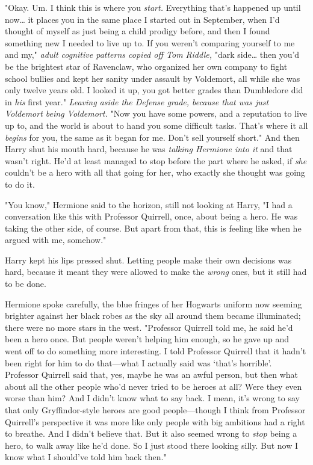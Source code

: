 "Okay. Um. I think this is where you \emph{start.} Everything that's happened
up until now{\ldots} it places you in the same place I started out in
September, when I'd thought of myself as just being a child prodigy before, and
then I found something new I needed to live up to. If you weren't comparing
yourself to me and my," \emph{adult cognitive patterns copied off Tom Riddle,}
"dark side{\ldots} then you'd be the brightest star of Ravenclaw, who organized
her own company to fight school bullies and kept her sanity under assault by
Voldemort, all while she was only twelve years old. I looked it up, you got
better grades than Dumbledore did in \emph{his} first year." \emph{Leaving
aside the Defense grade, because that was just Voldemort being Voldemort.} "Now
you have some powers, and a reputation to live up to, and the world is about to
hand you some difficult tasks. That's where it all \emph{begins} for you, the
same as it began for me. Don't sell yourself short." And then Harry shut his
mouth hard, because he was \emph{talking Hermione into it} and that wasn't
right. He'd at least managed to stop before the part where he asked, if
\emph{she} couldn't be a hero with all that going for her, who exactly she
thought was going to do it.

"You know," Hermione said to the horizon, still not looking at Harry, "I had a
conversation like this with Professor Quirrell, once, about being a hero. He
was taking the other side, of course. But apart from that, this is feeling like
when he argued with me, somehow."

Harry kept his lips pressed shut. Letting people make their own decisions was
hard, because it meant they were allowed to make the \emph{wrong} ones, but it
still had to be done.

Hermione spoke carefully, the blue fringes of her Hogwarts uniform now seeming
brighter against her black robes as the sky all around them became illuminated;
there were no more stars in the west. "Professor Quirrell told me, he said he'd
been a hero once. But people weren't helping him enough, so he gave up and went
off to do something more interesting. I told Professor Quirrell that it hadn't
been right for him to do that---what I actually said was `that's horrible'.
Professor Quirrell said that, yes, maybe he was an awful person, but then what
about all the other people who'd never tried to be heroes at all? Were they
even worse than him? And I didn't know what to say back. I mean, it's wrong to
say that only Gryffindor-style heroes are good people---though I think from
Professor Quirrell's perspective it was more like only people with big
ambitions had a right to breathe. And I didn't believe that. But it also seemed
wrong to \emph{stop} being a hero, to walk away like he'd done. So I just stood
there looking silly. But now I know what I should've told him back then."

